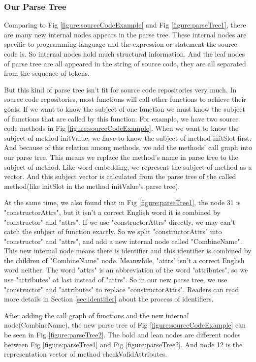 \subsubsection{Our Parse Tree}\label{sec:ourParseTree}
Comparing to Fig \ref{figure:sourceCodeExample} and Fig \ref{figure:parseTree1}, there are many new internal nodes appears in the parse tree. These internal nodes are specific to programming language and the expression or statement the source code is. So internal nodes hold much structural information. And the leaf nodes of parse tree are all appeared in the string of source code, they are all separated from the sequence of tokens.

But this kind of parse tree isn't fit for source code repositories very much. In source code repositories, most functions will call other functions to achieve their goals. If we want to know the subject of one function we must know the subject of functions that are called by this function. For example, we have two source code methods in Fig \ref{figure:sourceCodeExample}. When we want to know the subject of method initValue, we have to know the subject of method initSlot first. And because of this relation among methods, we add the methods' call graph into our parse tree. This means we replace the method's name in parse tree to the subject of method. Like word embedding, we represent the subject of method as a vector. And this subject vector is calculated from the parse tree of the called method(like initSlot in the method initValue's parse tree).

At the same time, we also found that in Fig \ref{figure:parseTree1}, the node 31 is "constructorAttrs", but it isn't a correct English word it is combined by "constructor" and "attrs". If we use "constructorAttrs" directly, we may can't catch the subject of function exactly. So we split "constructorAttrs" into "constructor" and "attrs", and add a new internal node called "CombineName". This new internal node means there is identifier and this identifier is combined by the children of "CombineName" node. Meanwhile, "attrs" isn't a correct English word neither. The word "attrs" is an abbreviation of the word "attributes", so we use "attributes" at last instead of "attrs". So in our new parse tree, we use "constructor" and "attributes" to replace "constructorAttrs". Readers can read more details in Section \ref{sec:identifier} about the process of identifiers.

After adding the call graph of functions and the new internal node(CombineName), the new parse tree of Fig \ref{figure:sourceCodeExample} can be seen in Fig \ref{figure:parseTree2}. The bold and lean nodes are different nodes between Fig \ref{figure:parseTree1} and Fig \ref{figure:parseTree2}. And node 12 is the representation vector of method checkValidAttributes.

